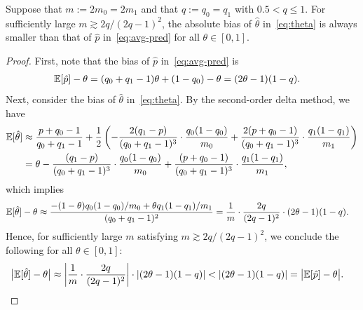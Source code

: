\begin{proposition}
    Suppose that $m := 2m_0 = 2m_1$ and that $q := q_0 = q_1$ with $0.5 < q \leq 1$. For sufficiently large $m\gtrsim 2q/(2q-1)^2$, the absolute bias of $\hat{\theta}$ in~\eqref{eq:theta} is always smaller than that of $\hat{p}$ in~\eqref{eq:avg-pred} for all $\theta \in [0,1]$.
\end{proposition}
\begin{proof}
First, note that the bias of $\hat{p}$ in~\eqref{eq:avg-pred} is
\begin{align}
    \displaystyle \mathbb{E}[\hat{p}] - \theta
    &=
    (q_0 + q_1 - 1)\theta + (1 - q_0) - \theta
    =
    (2\theta - 1)(1 - q).
\end{align}
Next, consider the bias of $\hat{\theta}$ in~\eqref{eq:theta}. By the second-order delta method, we have
\begin{align}
    \displaystyle \mathbb{E}[\hat{\theta}]
    &\approx
    \frac{p + q_0 - 1}{q_0 + q_1 - 1}
    +
    \frac{1}{2}\left(
        -\frac{2(q_1 - p)}{(q_0 + q_1 - 1)^3} \cdot \frac{q_0(1 - q_0)}{m_0}
        + \frac{2(p + q_0 - 1)}{(q_0 + q_1 - 1)^3} \cdot \frac{q_1(1 - q_1)}{m_1}
    \right)
    \\ &=
    \theta
    - \frac{(q_1 - p)}{(q_0 + q_1 - 1)^3} \cdot \frac{q_0(1 - q_0)}{m_0}
    + \frac{(p + q_0 - 1)}{(q_0 + q_1 - 1)^3} \cdot \frac{q_1(1 - q_1)}{m_1},
\end{align}
which implies
\begin{align}
    \displaystyle \mathbb{E}[\hat{\theta}] - \theta
    &\approx
    \frac{
        - (1 - \theta) q_0(1 - q_0)/m_0
        + \theta q_1(1 - q_1)/m_1
    }{(q_0 + q_1 - 1)^2}
    =
    \frac{1}{m} \cdot
    \frac{2q}{(2q - 1)^2} 
    \cdot
    (2\theta - 1)(1 - q)
    .
\end{align}
Hence, for sufficiently large $m$ satisfying $m\gtrsim 2q/(2q-1)^2$,
we conclude the following for all $\theta \in [0,1]$:
\begin{align}
    \big| \displaystyle \mathbb{E}[\hat{\theta}] - \theta \big|
    &\approx
    \left|
        \frac{1}{m} \cdot
        \frac{2q}{(2q - 1)^2} 
    \right|
    \cdot \left| (2\theta - 1)(1-q) \right|
    <
    \left| (2\theta - 1)(1-q) \right|
    =
    \big| \displaystyle \mathbb{E}[\hat{p}] - \theta \big|.
\end{align}
\end{proof}

